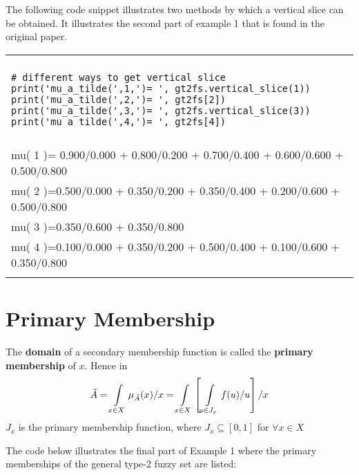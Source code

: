 \documentclass[]{article}
\begin{document}
\bigskip

The following code snippet illustrates two methods by which a vertical slice can be obtained. It illustrates the second part of example 1 that is found in the original paper.

\bigskip

\begin{tabular}{|l|}
\hline 
\lstset{language=Python}
\lstset{basicstyle=\scriptsize}
\\
\begin{lstlisting}
# different ways to get vertical slice
print('mu_a_tilde(',1,')= ', gt2fs.vertical_slice(1))
print('mu_a_tilde(',2,')= ', gt2fs[2])
print('mu_a_tilde(',3,')= ', gt2fs.vertical_slice(3))
print('mu_a_tilde(',4,')= ', gt2fs[4])
\end{lstlisting}
\\
\hline
\\
{\small mu( 1 )= 0.900/0.000 + 0.800/0.200 + 0.700/0.400 + 0.600/0.600 + 0.500/0.800}\\
{\small mu( 2 )=0.500/0.000 + 0.350/0.200 + 0.350/0.400 + 0.200/0.600 + 0.500/0.800}\\
{\small mu( 3 )=0.350/0.600 + 0.350/0.800}\\
{\small mu( 4 )=0.100/0.000 + 0.350/0.200 + 0.500/0.400 + 0.100/0.600 + 0.350/0.800}\\
\\ 
\hline 
\end{tabular} 

\section{Primary Membership}
The \textbf{domain} of a secondary membership function is called the \textbf{primary membership} of $x$. Hence in
\[
\tilde{A}=\int\displaylimits_{x \in X} \mu_{ \tilde{A} }(x) /x = \int\displaylimits_{x \in X} \left[  \int\displaylimits_{u\in J_{x}} f(u) / u \right]  /x
\]
$J_{x}$ is the primary membership function, where $J_{x} \subseteq [0,1]$ for $\forall x \in X$

\bigskip

The code below illustrates the final part of Example 1 where the primary memberships of the general type-2 fuzzy set are listed:

\bigskip
\end{document}

